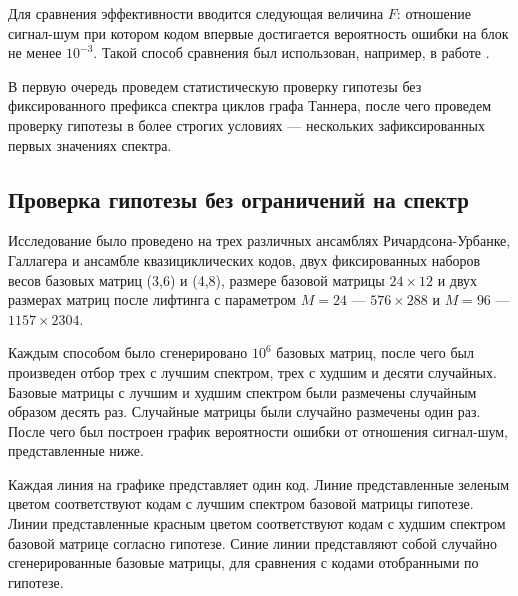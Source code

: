 Для сравнения эффективности вводится следующая величина $F$: отношение сигнал-шум при котором кодом
впервые достигается вероятность ошибки на блок не менее $10^{-3}$. Такой способ сравнения был использован,
например, в работе \cite{kudryashov-huawei}.

В первую очередь проведем статистическую проверку гипотезы без фиксированного префикса спектра циклов
графа Таннера, после чего проведем проверку гипотезы в более строгих условиях --- нескольких зафиксированных
первых значениях спектра.

\newcommand{\plotstandard}[2]{
\centerline{\texttt{[image: \#1]}}
\captionof{figure}{#2}
}

\newcommand{\plotsmall}[1]{\texttt{[image: \#1]}}

\subsection{Проверка гипотезы без ограничений на спектр}

Исследование было проведено на трех различных ансамблях Ричардсона-Урбанке, Галлагера и ансамбле
квазициклических кодов, двух фиксированных наборов весов базовых матриц (3,6) и (4,8), размере
базовой матрицы $24 \times 12$ и двух размерах матриц после лифтинга с параметром $M=24$ --- $576 \times 288$
и $M=96$ --- $1157 \times 2304$.

Каждым способом было сгенерировано $10^6$ базовых матриц, после чего был произведен отбор трех с лучшим
спектром, трех с худшим и десяти случайных. Базовые матрицы с лучшим и худшим спектром были размечены
случайным образом десять раз. Случайные матрицы были случайно размечены один раз. После чего был
построен график вероятности ошибки от отношения сигнал-шум, представленные ниже.

Каждая линия на графике представляет один код. Линие представленные зеленым цветом соответствуют
кодам с лучшим спектром базовой матрицы гипотезе. Линии представленные красным цветом соответствуют кодам с
худшим спектром базовой матрице согласно гипотезе. Синие линии представляют собой случайно сгенерированные
базовые матрицы, для сравнения с кодами отобранными по гипотезе.

